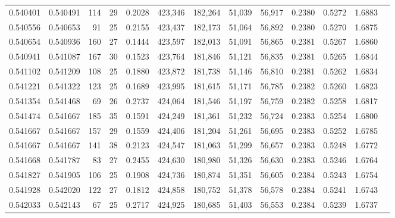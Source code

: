 \begin{tabular}{rrrrrrrrrrrrr}
0.540401 & 0.540491 &    114 &    29 &                                     0.2028 & 423,346 & 182,264 &  51,039 &  56,917 & 0.2380 & 0.5272 & 1.6883 \\
0.540556 & 0.540653 &     91 &    25 &                                     0.2155 & 423,437 & 182,173 &  51,064 &  56,892 & 0.2380 & 0.5270 & 1.6875 \\
0.540654 & 0.540936 &    160 &    27 &                                     0.1444 & 423,597 & 182,013 &  51,091 &  56,865 & 0.2381 & 0.5267 & 1.6860 \\
0.540941 & 0.541087 &    167 &    30 &                                     0.1523 & 423,764 & 181,846 &  51,121 &  56,835 & 0.2381 & 0.5265 & 1.6844 \\
0.541102 & 0.541209 &    108 &    25 &                                     0.1880 & 423,872 & 181,738 &  51,146 &  56,810 & 0.2381 & 0.5262 & 1.6834 \\
0.541221 & 0.541322 &    123 &    25 &                                     0.1689 & 423,995 & 181,615 &  51,171 &  56,785 & 0.2382 & 0.5260 & 1.6823 \\
0.541354 & 0.541468 &     69 &    26 &                                     0.2737 & 424,064 & 181,546 &  51,197 &  56,759 & 0.2382 & 0.5258 & 1.6817 \\
0.541474 & 0.541667 &    185 &    35 &                                     0.1591 & 424,249 & 181,361 &  51,232 &  56,724 & 0.2383 & 0.5254 & 1.6800 \\
0.541667 & 0.541667 &    157 &    29 &                                     0.1559 & 424,406 & 181,204 &  51,261 &  56,695 & 0.2383 & 0.5252 & 1.6785 \\
0.541667 & 0.541667 &    141 &    38 &                                     0.2123 & 424,547 & 181,063 &  51,299 &  56,657 & 0.2383 & 0.5248 & 1.6772 \\
0.541668 & 0.541787 &     83 &    27 &                                     0.2455 & 424,630 & 180,980 &  51,326 &  56,630 & 0.2383 & 0.5246 & 1.6764 \\
0.541827 & 0.541905 &    106 &    25 &                                     0.1908 & 424,736 & 180,874 &  51,351 &  56,605 & 0.2384 & 0.5243 & 1.6754 \\
0.541928 & 0.542020 &    122 &    27 &                                     0.1812 & 424,858 & 180,752 &  51,378 &  56,578 & 0.2384 & 0.5241 & 1.6743 \\
0.542033 & 0.542143 &     67 &    25 &                                     0.2717 & 424,925 & 180,685 &  51,403 &  56,553 & 0.2384 & 0.5239 & 1.6737 \\

\end{tabular}

